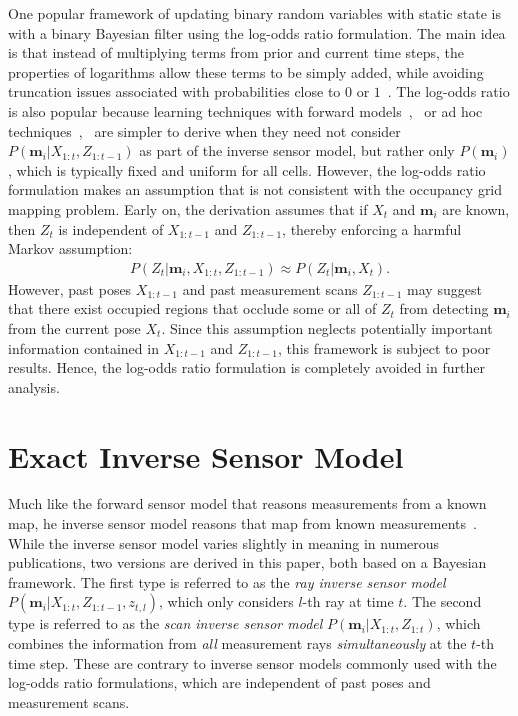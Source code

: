 \documentclass[letterpaper, 10pt, conference]{ieeeconf}
\begin{document}
One popular framework of updating binary random variables with static state is with a binary Bayesian filter using the log-odds ratio formulation.
The main idea is that instead of multiplying terms from prior and current time steps, the properties of logarithms allow these terms to be simply added, while avoiding truncation issues associated with probabilities close to $0$ or $1$~\cite{ThrBurFox05}.
The log-odds ratio is also popular because learning techniques with forward models~\cite{Thr01},~\cite{Thr03} or ad hoc techniques~\cite{MorElf85},~\cite{Elf89} are simpler to derive when they need not consider $P(\mathbf{m}_i|X_{1:t},Z_{1:t-1})$ as part of the inverse sensor model, but rather only $P(\mathbf{m}_i)$, which is typically fixed and uniform for all cells.
However, the log-odds ratio formulation makes an assumption that is not consistent with the occupancy grid mapping problem. Early on, the derivation assumes that if $X_t$ and $\mathbf{m}_i$ are known, then $Z_t$ is independent of $X_{1:t-1}$ and $Z_{1:t-1}$, thereby enforcing a harmful Markov assumption:
\begin{align}
\label{eqn:AssumptionEarly}
P(Z_t|\mathbf{m}_i,X_{1:t},Z_{1:t-1})\approx P(Z_t|\mathbf{m}_i,X_t).
\end{align}
However, past poses $X_{1:t-1}$ and past measurement scans $Z_{1:t-1}$ may suggest that there exist occupied regions that occlude some or all of $Z_t$ from detecting $\mathbf{m}_i$ from the current pose $X_t$.
Since this assumption neglects potentially important information contained in $X_{1:t-1}$ and $Z_{1:t-1}$, this framework is subject to poor results.
Hence, the log-odds ratio formulation is completely avoided in further analysis.


	
	
\section{Exact Inverse Sensor Model}
\label{sec:ISM}

Much like the forward sensor model that reasons measurements from a known map, he inverse sensor model reasons that map from known measurements~\cite{ThrBurFox05}.
While the inverse sensor model varies slightly in meaning in numerous publications, two versions are derived in this paper, both based on a Bayesian framework.
The first type is referred to as the \emph{ray inverse sensor model} $P(\mathbf{m}_i|X_{1:t},Z_{1:t-1},z_{t,l})$, which only considers $l$-th ray at time $t$.
The second type is referred to as the \emph{scan inverse sensor model} $P(\mathbf{m}_i|X_{1:t},Z_{1:t})$, which combines the information from \emph{all} measurement rays \emph{simultaneously} at the $t$-th time step.
These are contrary to inverse sensor models commonly used with the log-odds ratio formulations, which are independent of past poses and measurement scans.
\end{document}
